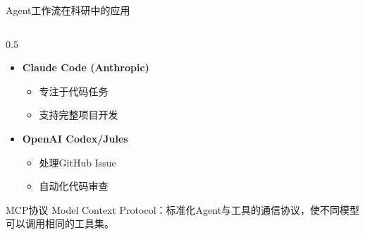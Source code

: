 \documentclass[aspectratio=169,11pt]{beamer}
\begin{document}
\begin{frame}{Agent工作流在科研中的应用}
\begin{columns}
\begin{column}{0.5\textwidth}
\begin{itemize}
                \item \textbf{Claude Code (Anthropic)}
                    \begin{itemize}
                        \item 专注于代码任务
                        \item 支持完整项目开发
                    \end{itemize}
                \item \textbf{OpenAI Codex/Jules}
                    \begin{itemize}
                        \item 处理GitHub Issue
                        \item 自动化代码审查
                    \end{itemize}
            \end{itemize}
            
            \vspace{0.3cm}
            \begin{alertblock}{MCP协议}
                \small
                Model Context Protocol：标准化Agent与工具的通信协议，使不同模型可以调用相同的工具集。
            \end{alertblock}
        \end{column}
    \end{columns}
\end{frame}
\end{document}
